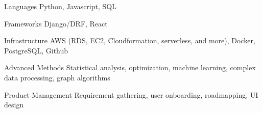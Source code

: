 

\begin{cvskills}
  \cvskill
    {Languages}
    {Python, Javascript, SQL}

  \cvskill
    {Frameworks}
    {Django/DRF, React}

  \cvskill
    {Infrastructure}
    {AWS (RDS, EC2, Cloudformation, serverless, and more), Docker, PostgreSQL, Github}

  \cvskill
    {Advanced Methods}
    {Statistical analysis, optimization, machine learning, complex data processing, graph algorithms}

  \cvskill
    {Product Management}
    {Requirement gathering, user onboarding, roadmapping, UI design}
\end{cvskills}
